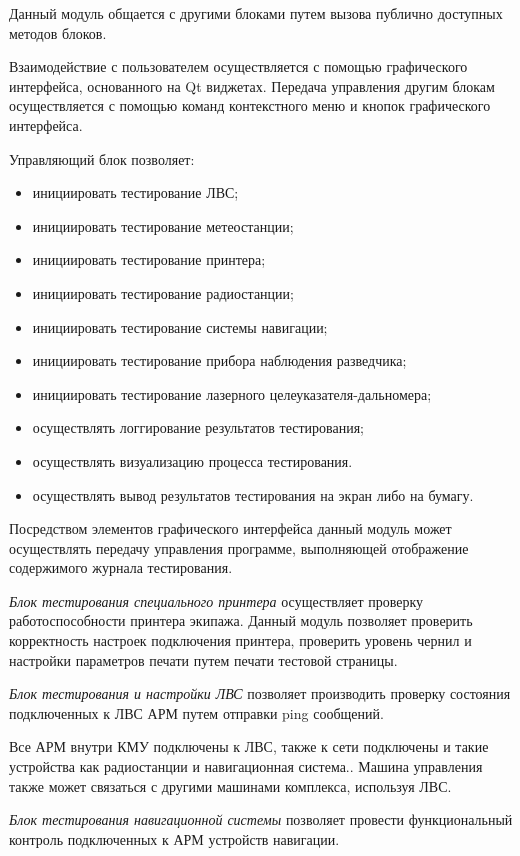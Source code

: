 Данный модуль общается с другими блоками путем вызова публично доступных методов блоков.

Взаимодействие с пользователем осуществляется с помощью графического интерфейса, основанного на Qt виджетах. Передача
управления другим блокам осуществляется с помощью команд контекстного меню и кнопок графического интерфейса.

Управляющий блок позволяет:
\begin{itemize}
	\item инициировать тестирование ЛВС;
	\item инициировать тестирование метеостанции;
	\item инициировать тестирование принтера;
	\item инициировать тестирование радиостанции;
	\item инициировать тестирование системы навигации;
	\item инициировать тестирование прибора наблюдения разведчика;
	\item инициировать тестирование лазерного целеуказателя-дальномера;
	\item осуществлять логгирование результатов тестирования;
	\item осуществлять визуализацию процесса тестирования.
	\item осуществлять вывод результатов тестирования на экран либо на бумагу.
\end{itemize}

Посредством элементов графического интерфейса данный модуль может осуществлять передачу управления программе,
выполняющей отображение содержимого журнала тестирования.

\textit{Блок тестирования специального принтера} осуществляет проверку работоспособности принтера экипажа. Данный модуль
позволяет проверить корректность настроек подключения принтера, проверить уровень чернил и настройки параметров печати
путем печати тестовой
страницы.

\textit{Блок тестирования и настройки ЛВС} позволяет производить проверку состояния подключенных к ЛВС АРМ путем
отправки ping сообщений.

Все АРМ внутри КМУ подключены к ЛВС, также к сети подключены и такие устройства как радиостанции и навигационная система..
Машина управления также может связаться с другими машинами комплекса, используя ЛВС.

\textit{Блок тестирования навигационной системы} позволяет провести функциональный контроль подключенных к АРМ устройств
навигации.

